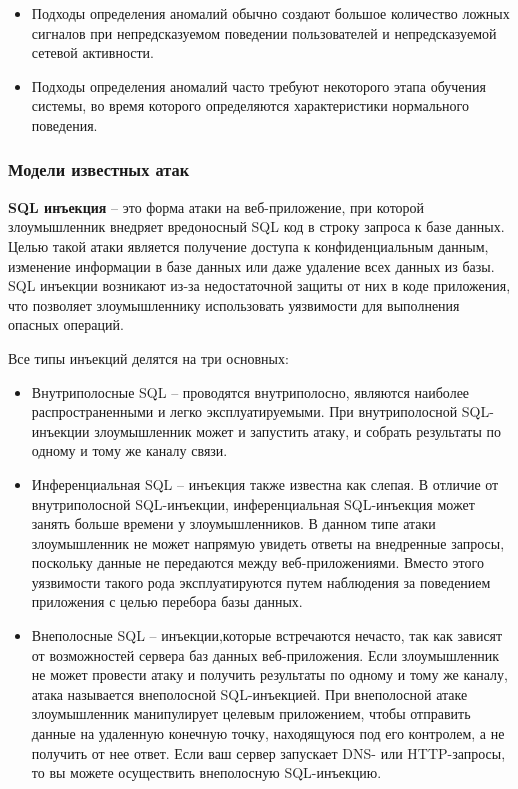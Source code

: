 \begin{itemize}
	\item Подходы определения аномалий обычно создают большое количество ложных сигналов
	при непредсказуемом поведении пользователей и непредсказуемой сетевой активности.

	\item Подходы определения аномалий часто требуют некоторого этапа обучения системы,
	во время которого определяются характеристики нормального поведения.
\end{itemize}



\subsubsection{Модели известных атак}

\textbf{SQL инъекция} -- это форма атаки на веб-приложение, при которой злоумышленник внедряет вредоносный SQL код в строку запроса к базе данных. Целью такой атаки является получение доступа к конфиденциальным данным, изменение информации в базе данных или даже удаление всех данных из базы. SQL инъекции возникают из-за недостаточной защиты от них в коде приложения, что позволяет злоумышленнику использовать уязвимости для выполнения опасных операций.

Все типы инъекций делятся на три основных:
\begin{itemize}
	\item Внутриполосные SQL -- проводятся внутриполосно, являются наиболее распространенными и легко эксплуатируемыми. При внутриполосной SQL-инъекции злоумышленник может и запустить атаку, и собрать результаты по одному и тому же каналу связи.
	
	\item Инференциальная SQL -- инъекция также известна как слепая. В отличие от внутриполосной SQL-инъекции, инференциальная SQL-инъекция может занять больше времени у злоумышленников. В  данном типе атаки злоумышленник не может напрямую увидеть ответы на внедренные запросы, поскольку данные не передаются между веб-приложениями. Вместо этого уязвимости такого рода эксплуатируются путем наблюдения за поведением приложения с целью перебора базы данных. 
	
	\item Внеполосные SQL -- инъекции,которые встречаются нечасто, так как зависят от возможностей сервера баз данных веб-приложения. Если злоумышленник не может провести атаку и получить результаты по одному и тому же каналу, атака называется внеполосной SQL-инъекцией. При внеполосной атаке злоумышленник манипулирует целевым приложением, чтобы отправить данные на удаленную конечную точку, находящуюся под его контролем, а не получить от нее ответ. 	Если ваш сервер запускает DNS- или HTTP-запросы, то вы можете осуществить внеполосную SQL-инъекцию. 
\end{itemize}

